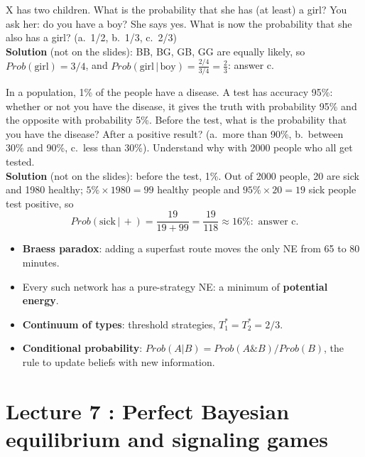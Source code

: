 \documentclass[11pt,a4paper,openany]{book}
\begin{document}
\begin{exbox}[title={Example 2: two children}]
X has two children. What is the probability that she has (at least) a girl? You ask her: do
you have a boy? She says yes. What is now the probability that she also has a girl?
(a.\ 1/2, b.\ 1/3, c.\ 2/3) \\
\textbf{Solution} (not on the slides): BB, BG, GB, GG are equally likely, so
$Prob(\text{girl}) = 3/4$, and
$Prob(\text{girl} \,|\, \text{boy}) = \frac{2/4}{3/4} = \frac{2}{3}$: answer c.
\end{exbox}

\begin{exbox}[title={Example 3: medical test}]
In a population, 1\% of the people have a disease. A test has accuracy 95\%: whether or not
you have the disease, it gives the truth with probability 95\% and the opposite with
probability 5\%. Before the test, what is the probability that you have the disease? After a
positive result? (a.\ more than 90\%, b.\ between 30\% and 90\%, c.\ less than 30\%).
Understand why with 2000 people who all get tested. \\
\textbf{Solution} (not on the slides): before the test, 1\%. Out of 2000 people, 20 are sick
and 1980 healthy; $5\% \times 1980 = 99$ healthy people and $95\% \times 20 = 19$ sick people
test positive, so
\[
Prob(\text{sick} \,|\, +) = \frac{19}{19 + 99} = \frac{19}{118} \approx 16\%: \text{ answer c.}
\]
\end{exbox}

\begin{keybox}[title=Summary]
\begin{itemize}
  \item \textbf{Braess paradox}: adding a superfast route moves the only NE from 65 to 80
        minutes.
  \item Every such network has a pure-strategy NE: a minimum of \textbf{potential energy}.
  \item \textbf{Continuum of types}: threshold strategies, $T_1^* = T_2^* = 2/3$.
  \item \textbf{Conditional probability}: $Prob(A|B) = Prob(A \& B)/Prob(B)$, the rule to
        update beliefs with new information.
\end{itemize}
\end{keybox}


\chapter{Lecture 7 : Perfect Bayesian equilibrium and signaling games}
\end{document}

